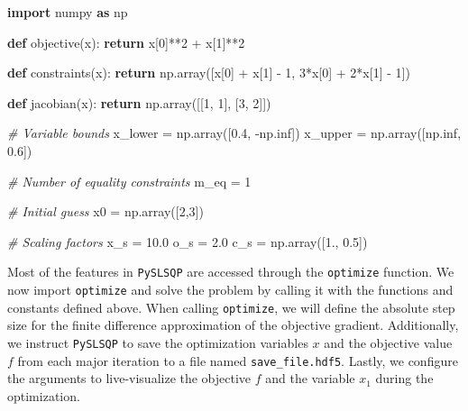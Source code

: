 \documentclass[
]{article}
\newenvironment{Shaded}{}{}
\newcommand{\CommentTok}[1]{\textcolor[rgb]{0.38,0.63,0.69}{\textit{#1}}}
\newcommand{\ControlFlowTok}[1]{\textcolor[rgb]{0.00,0.44,0.13}{\textbf{#1}}}
\newcommand{\DecValTok}[1]{\textcolor[rgb]{0.25,0.63,0.44}{#1}}
\newcommand{\FloatTok}[1]{\textcolor[rgb]{0.25,0.63,0.44}{#1}}
\newcommand{\ImportTok}[1]{\textcolor[rgb]{0.00,0.50,0.00}{\textbf{#1}}}
\newcommand{\KeywordTok}[1]{\textcolor[rgb]{0.00,0.44,0.13}{\textbf{#1}}}
\newcommand{\NormalTok}[1]{#1}
\newcommand{\OperatorTok}[1]{\textcolor[rgb]{0.40,0.40,0.40}{#1}}
\begin{document}
\begin{Shaded}
\begin{Highlighting}[]
\ImportTok{import}\NormalTok{ numpy }\ImportTok{as}\NormalTok{ np}

\KeywordTok{def}\NormalTok{ objective(x):}
    \ControlFlowTok{return}\NormalTok{ x[}\DecValTok{0}\NormalTok{]}\OperatorTok{**}\DecValTok{2} \OperatorTok{+}\NormalTok{ x[}\DecValTok{1}\NormalTok{]}\OperatorTok{**}\DecValTok{2}

\KeywordTok{def}\NormalTok{ constraints(x):}
    \ControlFlowTok{return}\NormalTok{  np.array([x[}\DecValTok{0}\NormalTok{] }\OperatorTok{+}\NormalTok{ x[}\DecValTok{1}\NormalTok{] }\OperatorTok{{-}} \DecValTok{1}\NormalTok{, }\DecValTok{3}\OperatorTok{*}\NormalTok{x[}\DecValTok{0}\NormalTok{] }\OperatorTok{+} \DecValTok{2}\OperatorTok{*}\NormalTok{x[}\DecValTok{1}\NormalTok{] }\OperatorTok{{-}} \DecValTok{1}\NormalTok{])}

\KeywordTok{def}\NormalTok{ jacobian(x):}
    \ControlFlowTok{return}\NormalTok{ np.array([[}\DecValTok{1}\NormalTok{, }\DecValTok{1}\NormalTok{], [}\DecValTok{3}\NormalTok{, }\DecValTok{2}\NormalTok{]])}

\CommentTok{\# Variable bounds}
\NormalTok{x\_lower }\OperatorTok{=}\NormalTok{ np.array([}\FloatTok{0.4}\NormalTok{, }\OperatorTok{{-}}\NormalTok{np.inf])}
\NormalTok{x\_upper }\OperatorTok{=}\NormalTok{ np.array([np.inf, }\FloatTok{0.6}\NormalTok{])}

\CommentTok{\# Number of equality constraints}
\NormalTok{m\_eq }\OperatorTok{=} \DecValTok{1}

\CommentTok{\# Initial guess}
\NormalTok{x0 }\OperatorTok{=}\NormalTok{ np.array([}\DecValTok{2}\NormalTok{,}\DecValTok{3}\NormalTok{])}

\CommentTok{\# Scaling factors}
\NormalTok{x\_s }\OperatorTok{=} \FloatTok{10.0}
\NormalTok{o\_s }\OperatorTok{=}  \FloatTok{2.0}
\NormalTok{c\_s }\OperatorTok{=}\NormalTok{ np.array([}\FloatTok{1.}\NormalTok{, }\FloatTok{0.5}\NormalTok{])}
\end{Highlighting}
\end{Shaded}

Most of the features in \texttt{PySLSQP} are accessed through the
\texttt{optimize} function. We now import \texttt{optimize} and solve
the problem by calling it with the functions and constants defined
above. When calling \texttt{optimize}, we will define the absolute step
size for the finite difference approximation of the objective gradient.
Additionally, we instruct \texttt{PySLSQP} to save the optimization
variables \(x\) and the objective value \(f\) from each major iteration
to a file named \texttt{save\_file.hdf5}. Lastly, we configure the
arguments to live-visualize the objective \(f\) and the variable \(x_1\)
during the optimization.
\end{document}
